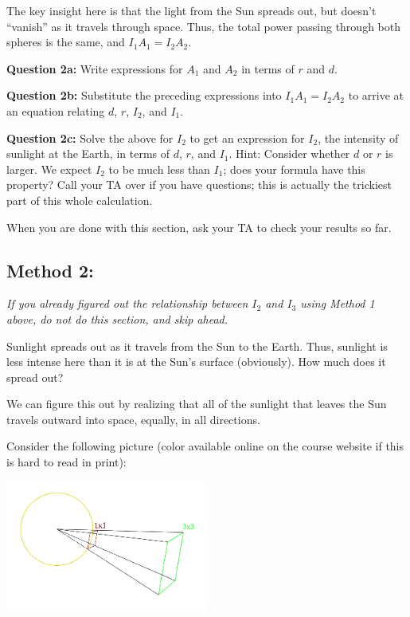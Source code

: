 \documentclass[11pt]{article}
\def\BC{\begin{center}}
\def\EC{\end{center}}
\begin{document}
The key insight here is that the light from the Sun spreads out, but doesn't ``vanish'' as it travels through space. Thus,
the total power passing through both spheres is the same, and $I_1 A_1 = I_2 A_2$.

{\bf Question 2a:} Write expressions for $A_1$ and $A_2$ in terms of $r$ and $d$.

\vspace*{5cm}

\hrulefill

\newpage
{\bf Question 2b:} Substitute the preceding expressions into $I_1 A_1 = I_2 A_2$ to arrive at an equation relating $d$, $r$,
$I_2$, and $I_1$.

\vspace*{5cm}

\hrulefill

{\bf Question 2c:} Solve the above for $I_2$ to get an expression for $I_2$, the intensity of sunlight at the Earth, in terms of
$d$, $r$, and $I_1$.
Hint: Consider whether $d$ or $r$ is larger.
We expect $I_2$ to be much less than $I_1$; does your formula have this property? Call your TA over if you have questions; this is actually the trickiest part of this whole calculation.
\vspace*{4cm}

\hrulefill




When you are done with this section, ask your TA to check your results so far.

\newpage

\subsection*{Method 2:}

{\color{red} \it If you already figured out the relationship between $I_2$ and $I_3$ using Method 1 above, do not do this section, and skip ahead.}

Sunlight spreads out as it travels from the Sun to the Earth. Thus, sunlight is less intense here than it is at the Sun's surface (obviously). How much does it spread out?

We can figure this out by realizing that all of the sunlight that leaves the Sun travels outward into space, equally, in all directions.

Consider the following picture (color available online on the course website if this is hard to read in print):

\BC
\includegraphics[width=0.5\textwidth]{expansion.png}
\EC
\end{document}
